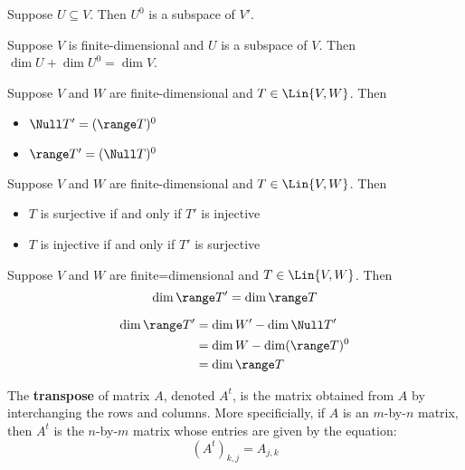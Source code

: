\begin{theorem}
   Suppose $U \subseteq V$. Then $U^0$ is a subspace of $V'$.
\end{theorem}

\begin{theorem}
   Suppose $V$ is finite-dimensional and $U$ is a subspace of $V$.
   Then $\dim U + \dim U^0 = \dim V$.
\end{theorem}

\begin{theorem}
   Suppose $V$ and $W$ are finite-dimensional and $T \in \Lin{V, W}$. Then
   \begin{itemize}
      \item $\Null T' = (\range T)^0$
      \item $\range T' = (\Null T)^0$
   \end{itemize}
\end{theorem}

\begin{theorem} 
   Suppose $V$ and $W$ are finite-dimensional and $T \in \Lin{V, W}$. Then
   \begin{itemize}
      \item $T$ is surjective if and only if $T'$ is injective
      \item $T$ is injective if and only if $T'$ is surjective
   \end{itemize}
\end{theorem}

\begin{theorem}
   Suppose $V$ and $W$ are finite=dimensional and $T \in \Lin{V, W}$. Then
   \[ \dim \range T' = \dim \range T \]

   \begin{proof*}
      \begin{align*}
         \dim \range T' &= \dim W' - \dim \Null T' \\
         &= \dim W - \dim(\range T)^0 \\
         &= \dim \range T
      \end{align*}
   \end{proof*}
\end{theorem}

\begin{definition} [Transpose]
   The \textbf{transpose} of matrix $A$, denoted $A^t$, is the matrix
   obtained from $A$ by interchanging the rows and columns. More specificially,
   if $A$ is an $m$-by-$n$ matrix, then $A^t$ is the $n$-by-$m$ matrix whose entries are
   given by the equation:
   \[ (A^t)_{k,j} = A_{j,k} \]
\end{definition}

